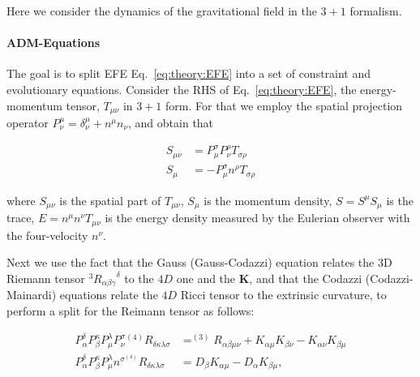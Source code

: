 Here we consider the dynamics of the gravitational field in the $3+1$ formalism.

\paragraph{ADM-Equations}

The goal is to split \ac{EFE} Eq.~\eqref{eq:theory:EFE} into a set of constraint and evolutionary 
equations. Consider the \ac{RHS} of Eq.~\eqref{eq:theory:EFE}, the energy-momentum tensor, 
$T_{\mu\nu}$ in $3+1$ form. For that we employ the spatial projection operator 
$P^{\mu}_{\nu} = \delta_{\nu}^{\mu} + n^{\mu}n_{\nu}$, and obtain that 

\begin{subequations}
    \begin{align}
    S_{\mu\nu} &= P^{\sigma}_{\mu} P^{\rho}_{\nu} T_{\sigma\rho} \label{eq:theory:s_munu}\\
    S_{\mu} &= -P^{\sigma}_{\mu} n^{\rho} T_{\sigma\rho} \label{eq:theory:smu}
    \end{align}
\end{subequations}

where $S_{\mu\nu}$ is the spatial part of $T_{\mu\nu}$, $S_{\mu}$ is the momentum density, 
$S=S^{\mu}S_{\mu}$ is the trace, $E=n^{\mu}n^{\nu}T_{\mu\nu}$ is the energy density measured by 
the Eulerian observer with the four-velocity $n^{\nu}$.

Next we use the fact that the Gauss (Gauss-Codazzi) equation relates the $3$D Riemann tensor
$^3{R_{\alpha\beta\gamma}}^{\delta}$ to the $4D$ one and the $\boldsymbol{K}$, and that the 
Codazzi (Codazzi-Mainardi) equations relate the $4D$ Ricci tensor to the extrinsic curvature,
to perform a split for the Reimann tensor as follows:

\begin{subequations}
    \begin{align}
        P_{\alpha}^{\delta}P_{\beta}^{\kappa}P_{\mu}^{\lambda}P_{\nu}^{\sigma} ^{(4)}R_{\delta\kappa\lambda\sigma} &= 
        ^{(3)}R_{\alpha\beta\mu\nu} + K_{\alpha\mu}K_{\beta\nu} - K_{\alpha\nu}K_{\beta\mu} \label{eq:theory:gc}\\
        P_{\alpha}^{\delta}P_{\beta}^{\kappa}P_{\mu}^{\lambda}n^{\sigma} ^{(4)}R_{\delta\kappa\lambda\sigma} &= D_{\beta}K_{\alpha\mu} - D_{\alpha}K_{\beta\mu}, \label{eq:theory:gm}
    \end{align}
\end{subequations}

